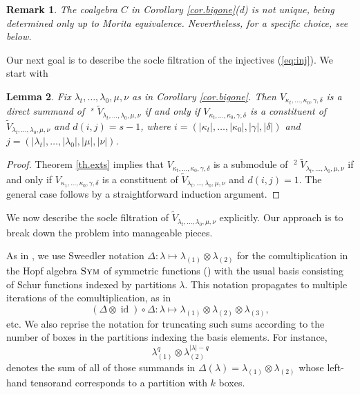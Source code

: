 \documentclass[11pt]{article}
\theoremstyle{plain}
\newtheorem{lemma}{Lemma}[section]
\theoremstyle{nonumberplain}
\theoremstyle{plain}
\newtheorem{remark}[lemma]{Remark}
\theoremstyle{nonumberplain}
\newtheorem{proof}{Proof}
\DeclareMathOperator{\id}{id}
\DeclareMathOperator{\usoc}{\underline{\mathrm{soc}}}
\DeclareMathOperator{\sym}{\cat{Sym}}
\newcommand{\cat}[1]{\textsc{#1}}
\begin{document}
\begin{remark}\label{re.not-unique}
  The coalgebra $C$ in Corollary \ref{cor.bigone}(d) is not unique, being
  determined only up to Morita equivalence. Nevertheless, for a
  specific choice, see  below.
\end{remark}



Our next goal is to describe the socle filtration of the injectives (\ref{eq:inj}).  We start with

\begin{lemma}\label{lem:blah}
	Fix $\lambda_t,\ldots,\lambda_0,\mu,\nu$ as in Corollary \ref{cor.bigone}.  Then $V_{\kappa_t,\ldots,\kappa_0,\gamma,\delta}$ is a direct summand of $\usoc^s\widetilde{V}_{\lambda_t,\ldots,\lambda_0,\mu,\nu}$ if and only if $V_{\kappa_t,\ldots,\kappa_0,\gamma,\delta}$ is a constituent of $\tilde{V}_{\lambda_t,\ldots,\lambda_0,\mu,\nu}$ and $d(i,j)=s-1$, where $i=\left(|\kappa_t|,\ldots,|\kappa_0|,|\gamma|,|\delta|\right)$ and $j=\left(|\lambda_t|,\ldots,|\lambda_0|,|\mu|,|\nu|\right)$.
\end{lemma}

\begin{proof}
	Theorem \ref{th.exts} implies that $V_{\kappa_t,\ldots,\kappa_0,\gamma,\delta}$ is a submodule of $\usoc^2 \tilde{V}_{\lambda_t,\ldots,\lambda_0,\mu,\nu}$ if and only if $V_{\kappa_1,\ldots,\kappa_0,\gamma,\delta}$ is a constituent of $\tilde{V}_{\lambda_t,\ldots,\lambda_0,\mu,\nu}$ and $d(i,j)=1$.  The general case follows by a straightforward induction argument.
\end{proof}

We now describe the socle filtration of $\tilde{V}_{\lambda_t,\ldots,\lambda_0,\mu,\nu}$ explicitly.  Our approach is to break down the problem into manageable pieces.



As in \cite[$\S$3.2]{us}, we
use Sweedler notation $\Delta:\lambda\mapsto
\lambda_{(1)}\otimes\lambda_{(2)}$ for the comultiplication in the
Hopf algebra $\sym$ of symmetric functions (\cite{sym}) with the usual
basis consisting of Schur functions indexed by partitions
$\lambda$. This notation propagates to multiple iterations of the
comultiplication, as in 
\begin{equation*}
  (\Delta\otimes\id)\circ\Delta:\lambda\mapsto \lambda_{(1)}\otimes \lambda_{(2)}\otimes\lambda_{(3)},
\end{equation*}
etc. We also reprise the notation for truncating such sums according
to the number of boxes in the partitions indexing the basis
elements. For instance, 
\begin{equation*}
  \lambda_{(1)}^q\otimes\lambda_{(2)}^{|\lambda|-q}
\end{equation*}
denotes the sum of all of those summands in
$\Delta(\lambda)=\lambda_{(1)}\otimes\lambda_{(2)}$ whose left-hand
tensorand corresponds to a partition with $k$ boxes. 
\end{document}
